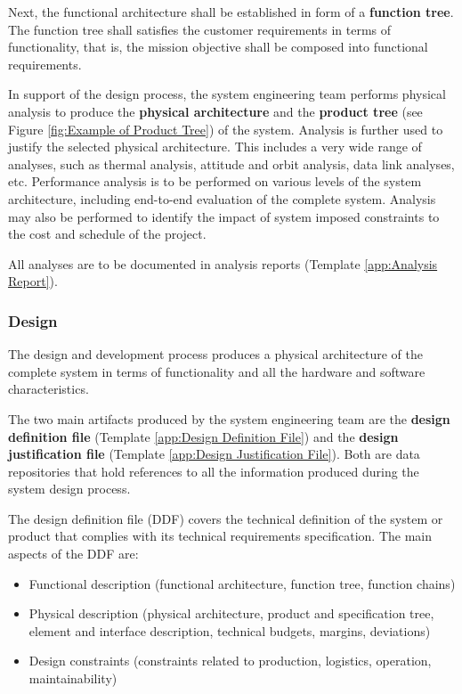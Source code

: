 Next, the functional architecture shall be established in form of a \textbf{function tree}. The function tree shall satisfies the customer requirements in terms of functionality, that is, the mission objective shall be composed into functional requirements.

In support of the design process, the system engineering team performs physical analysis to produce the \textbf{physical architecture} and the \textbf{product tree} (see Figure \ref{fig:Example of Product Tree}) of the system. Analysis is further used to justify the selected physical architecture. This includes a very wide range of analyses, such as thermal analysis, attitude and orbit analysis, data link analyses, etc. Performance analysis is to be performed on various levels of the system architecture, including end-to-end evaluation of the complete system. Analysis may also be performed to identify the impact of system imposed constraints to the cost and schedule of the project. 

All analyses are to be documented in analysis reports (Template \ref{app:Analysis Report}).

\subsubsection{Design}

The design and development process produces a physical architecture of the complete system in terms of functionality and all the hardware and software characteristics.

The two main artifacts produced by the system engineering team are the \textbf{design definition file} (Template \ref{app:Design Definition File}) and the \textbf{design justification file} (Template \ref{app:Design Justification File}). Both are data repositories that hold references to all the information produced during the system design process. 

The design definition file (DDF) covers the technical definition of the system or product that complies with its technical requirements specification. The main aspects of the DDF are:

\begin{itemize}
\item Functional description (functional architecture, function tree, function chains)
\item Physical description (physical architecture, product and specification tree, element and interface description, technical budgets, margins, deviations)
\item Design constraints (constraints related to production, logistics, operation, maintainability)
\end{itemize}

